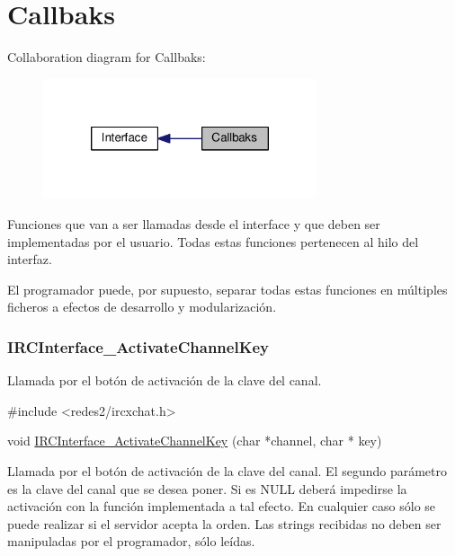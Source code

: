 \hypertarget{group___i_r_c_interface_callbacks}{\section{Callbaks}
\label{group___i_r_c_interface_callbacks}
}
Collaboration diagram for Callbaks\-:
\nopagebreak
\begin{figure}[H]
\begin{center}
\leavevmode
\includegraphics[width=228pt]{group___i_r_c_interface_callbacks}
\end{center}
\end{figure}
Funciones que van a ser llamadas desde el interface y que deben ser implementadas por el usuario. Todas estas funciones pertenecen al hilo del interfaz.

El programador puede, por supuesto, separar todas estas funciones en múltiples ficheros a efectos de desarrollo y modularización.



 \hypertarget{IRCInterface_ActivateChannelKey}{}\subsubsection{I\-R\-C\-Interface\-\_\-\-Activate\-Channel\-Key}\label{IRCInterface_ActivateChannelKey}
Llamada por el botón de activación de la clave del canal.


\begin{DoxyCode}
\textcolor{preprocessor}{#include <redes2/ircxchat.h>}

\textcolor{keywordtype}{void} \hyperlink{xchat2_8c_a33f80a29a744e4182b29e23f13c1f05c}{IRCInterface\_ActivateChannelKey} (\textcolor{keywordtype}{char} *channel, \textcolor{keywordtype}{char} * key)
\end{DoxyCode}


Llamada por el botón de activación de la clave del canal. El segundo parámetro es la clave del canal que se desea poner. Si es N\-U\-L\-L deberá impedirse la activación con la función implementada a tal efecto. En cualquier caso sólo se puede realizar si el servidor acepta la orden. Las strings recibidas no deben ser manipuladas por el programador, sólo leídas.


